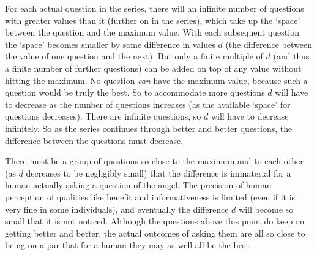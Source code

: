 For each actual question in the series, there will an infinite number of questions with greater values than it (further on in the series), which take up the `space' between the question and the maximum value.
With each subsequent question the `space' becomes smaller by some difference in values $d$ (the difference between the value of one question and the next).
But only a finite multiple of $d$ (and thus a finite number of further questions) can be added on top of any value without hitting the maximum.
No question \emph{can} have the maximum value, because such a question would be truly the best.
So to accommodate more questions $d$ will have to decrease as the number of questions increases (as the available `space' for questions decreases).
There are infinite questions, so $d$ will have to decrease infinitely.
So as the series continues through better and better questions, the difference between the questions must decrease.




There must be a group of questions so close to the maximum and to each other (as $d$ decreases to be negligibly small) that the difference is immaterial for a human actually asking a question of the angel.
The precision of human perception of qualities like benefit and informativeness is limited (even if it is very fine in some individuals), and eventually the difference $d$ will become so small that it is not noticed.
Although the questions above this point do keep on getting better and better, the actual outcomes of asking them are all so close to being on a par that for a human they may as well all be the best.

